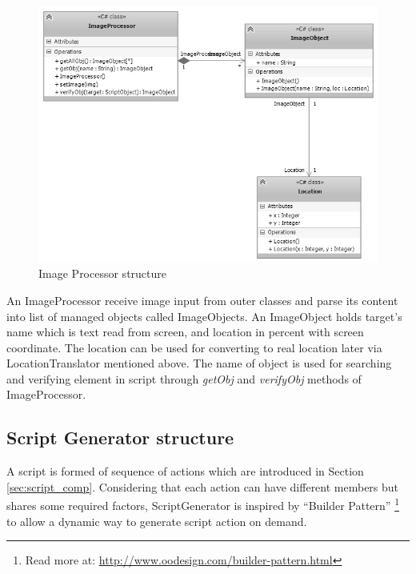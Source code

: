 	\begin{figure}[H]
		\centering
		\includegraphics[scale=0.75]{Chapters/Fig/img_processor.png}
		\caption{Image Processor structure}
		\label{fig:img_processor}
	\end{figure}

An ImageProcessor receive image input from outer classes and parse its content into list of managed objects called ImageObjects. An ImageObject holds target's name which is text read from screen, and location in percent with screen coordinate. The location can be used for converting to real location later via LocationTranslator mentioned above. The name of object is used for searching and verifying element in script through \textit{getObj} and \textit{verifyObj} methods of ImageProcessor.

\subsection{Script Generator structure}
A script is formed of sequence of actions which are introduced in Section \ref{sec:script_comp}. Considering that each action can have different members but shares some required factors, ScriptGenerator is inspired by ``Builder Pattern'' \footnote{Read more at: \url{http://www.oodesign.com/builder-pattern.html}} to allow a dynamic way to generate script action on demand.


